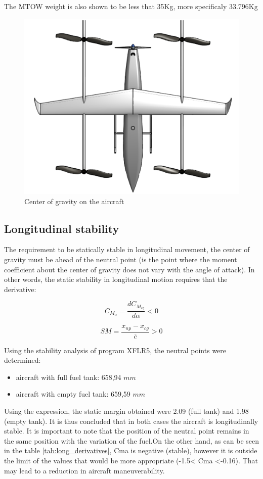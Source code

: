 \documentclass[english,fira]{ist-report}
\begin{document}
 The MTOW weight is also shown to be less that 35Kg, more specificaly 33.796Kg
\begin{figure}[!ht]
    \centering
    	\includegraphics[width = 0.55\linewidth]{graphics/image_cg_position.png}
    \caption{Center of gravity on the aircraft}
    \label{fig:center of gravity on the aircraft}
\end{figure}

\subsection{Longitudinal stability}
The requirement to be statically stable in longitudinal movement, the center of gravity must be ahead of the neutral point (is the point where the moment coefficient about the center of gravity does not vary with the angle of attack). In other words, the static stability in longitudinal motion requires that the derivative:

\begin{equation}
   C_{M_{\alpha}} = \dfrac{d C_{M_{cg}}}{d 
   \alpha} < 0 
    \label{eq. long_moment coefficient}
\end{equation}

\begin{equation}
   SM = \dfrac{x_{np}-x_{cg}}{\overline c} > 0 
    \label{Static margin}
\end{equation}

Using the stability analysis of program XFLR5, the neutral points were determined:
\begin{itemize}
\item aircraft with full fuel tank: 658,94 $mm$
\item aircraft with empty fuel tank: 659,59 $mm$
\end{itemize}

Using the expression, the static margin obtained were 2.09 (full tank) and 1.98 (empty tank). It is thus concluded that in both cases the aircraft is longitudinally stable. It is important to note that the position of the neutral point remains in the same position with the variation of the fuel.On the other hand, as can be seen in the table \ref{tab:long_derivatives}, Cma is negative (stable), however it is outside the limit of the values that would be more appropriate (-1.5< Cma <-0.16). That may lead to a reduction in aircraft maneuverability.
\end{document}
